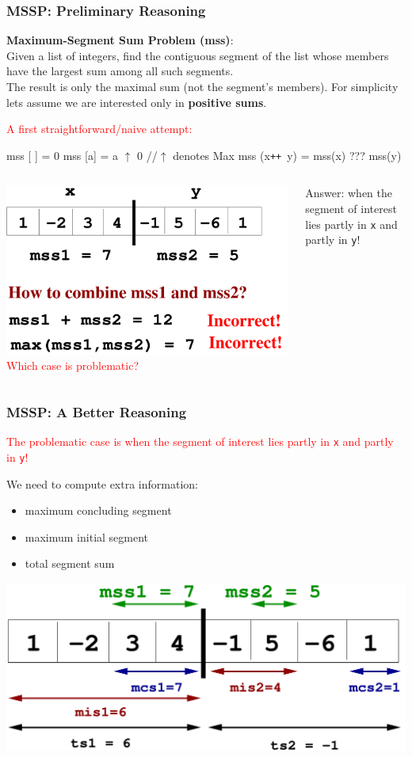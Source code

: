 \documentclass{beamer}
\newcommand{\red}[1]{\textcolor{Red}{{#1}}}
\renewcommand{\emph}[1]{\textcolor{structure}{#1}}
\newcommand{\emp}[1]{\textcolor{DikuRed}{ #1}}
\newcommand{\mymath}[1]{$ #1 $}
\begin{document}
\begin{frame}[fragile,t]
  \frametitle{MSSP: Preliminary Reasoning}

\emp{\bf Maximum-Segment Sum Problem ({\sc mss})}: \\
Given a list of integers, find the contiguous segment of the list 
whose members have the largest sum among all such segments.\\
The result is only the maximal sum (not the segment's members).
For simplicity lets assume we are interested only in {\bf positive sums}.
\medskip

\red{A first straightforward/naive attempt:}
\begin{colorcode}
mss [ ]      = 0
mss [a]      = a \mymath{\uparrow} 0  \emp{//\mymath{\uparrow} denotes Max}
mss (x{\tt ++}\mbox{ }y) = mss(x) ??? mss(y)
\end{colorcode}

\bigskip
\bigskip

\begin{columns}
\pause
\includegraphics[height=20ex]{Figures/L1/mssp1}
\red{Which case is problematic?}\pause\bigskip

\emph{Answer: when the segment of interest lies partly in {\tt x} and partly in {\tt y}!}
\end{columns}
\end{frame}

\begin{frame}[fragile,t]
  \frametitle{MSSP: A Better Reasoning}

\red{The problematic case is when the segment of interest lies
     partly in {\tt x} and partly in {\tt y}!}
\bigskip

We need to compute extra information:\pause
\begin{itemize}
    \item maximum concluding segment
    \item maximum initial segment
    \item total segment sum
\end{itemize}\smallskip\pause

\includegraphics[height=22ex]{Figures/L1/mssp2}

\end{frame}
\end{document}
